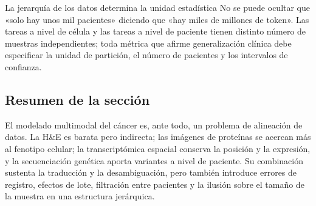\begin{importantbox}{La jerarquía de los datos determina la unidad estadística}
No se puede ocultar que «solo hay unos mil pacientes» diciendo que «hay miles de millones de token». Las tareas a nivel de célula y las tareas a nivel de paciente tienen distinto número de muestras independientes; toda métrica que afirme generalización clínica debe especificar la unidad de partición, el número de pacientes y los intervalos de confianza.
\end{importantbox}


\subsection{Resumen de la sección}

El modelado multimodal del cáncer es, ante todo, un problema de alineación de datos. La H\&E es barata pero indirecta; las imágenes de proteínas se acercan más al fenotipo celular; la transcriptómica espacial conserva la posición y la expresión, y la secuenciación genética aporta variantes a nivel de paciente. Su combinación sustenta la traducción y la desambiguación, pero también introduce errores de registro, efectos de lote, filtración entre pacientes y la ilusión sobre el tamaño de la muestra en una estructura jerárquica.
